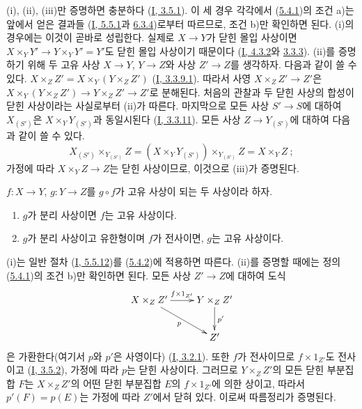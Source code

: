 (i), (ii), (iii)만 증명하면 충분하다
(\hyperref[I.3.5.1-ko]{I, 3.5.1}). 이 세 경우 각각에서
(\hyperref[II.5.4.1-ko]{5.4.1})의 조건 a)는 앞에서 얻은 결과들
(\hyperref[I.5.5.1-ko]{I, 5.5.1}과
\hyperref[I.6.3.4-ko]{6.3.4})로부터 따르므로, 조건 b)만 확인하면 된다.
(i)의 경우에는 이것이 곧바로 성립한다. 실제로 $X\to Y$가 닫힌 몰입
사상이면 $X\times_YY'\to Y\times_YY'=Y'$도 닫힌 몰입 사상이기 때문이다
(\hyperref[I.4.3.2-ko]{I, 4.3.2}와
\hyperref[II.3.3.3-ko]{3.3.3}). (ii)를 증명하기 위해 두 고유 사상
$X\to Y$, $Y\to Z$와 사상 $Z'\to Z$를 생각하자. 다음과 같이 쓸 수 있다.
$X\times_ZZ'=X\times_Y(Y\times_ZZ')$
(\hyperref[I.3.3.9.1-ko]{I, 3.3.9.1}). 따라서 사영
$X\times_ZZ'\to Z'$은
$X\times_Y(Y\times_ZZ')\to Y\times_ZZ'\to Z'$로 분해된다. 처음의
관찰과 두 닫힌 사상의 합성이 닫힌 사상이라는 사실로부터 (ii)가 따른다.
마지막으로 모든 사상 $S'\to S$에 대하여 $X_{(S')}$은
$X\times_YY_{(S')}$과 동일시된다
(\hyperref[I.3.3.11-ko]{I, 3.3.11}). 모든 사상
$Z\to Y_{(S')}$에 대하여 다음과 같이 쓸 수 있다.
\[
  X_{(S')}\times_{Y_{(S')}}Z
  =(X\times_YY_{(S')})\times_{Y_{(S')}}Z=X\times_YZ~;
\]
가정에 따라 $X\times_YZ\to Z$는 닫힌 사상이므로, 이것으로 (iii)가
증명된다.

\begin{corollary}[5.4.3]
\label{II.5.4.3-ko}
$f:X\to Y$, $g:Y\to Z$를 $g\circ f$가 고유 사상이 되는 두 사상이라
하자.
\begin{enumerate}
  \item[\rm{(i)}] $g$가 분리 사상이면 $f$는 고유 사상이다.
  \item[\rm{(ii)}] $g$가 분리 사상이고 유한형이며 $f$가 전사이면,
  $g$는 고유 사상이다.
\end{enumerate}
\end{corollary}

(i)는 일반 절차
(\hyperref[I.5.5.12-ko]{I, 5.5.12})를
(\hyperref[II.5.4.2-ko]{5.4.2})에 적용하면 따른다. (ii)를 증명할
때에는 정의 (\hyperref[II.5.4.1-ko]{5.4.1})의 조건 b)만 확인하면 된다.
모든 사상 $Z'\to Z$에 대하여 도식
\[
  \xymatrix{
    X\times_ZZ'\ar[r]^{f\times1_{Z'}}\ar[dr]_p &
    Y\times_ZZ'\ar[d]^{p'}\\
    & Z'
  }
\]
은 가환한다(여기서 $p$와 $p'$은 사영이다)
(\hyperref[I.3.2.1-ko]{I, 3.2.1}). 또한 $f$가 전사이므로
$f\times1_{Z'}$도 전사이고
(\hyperref[I.3.5.2-ko]{I, 3.5.2}), 가정에 따라 $p$는 닫힌 사상이다.
그러므로 $Y\times_ZZ'$의 모든 닫힌 부분집합 $F$는
$X\times_ZZ'$의 어떤 닫힌 부분집합 $E$의 $f\times1_{Z'}$에 의한 상이고,
따라서 $p'(F)=p(E)$는 가정에 따라 $Z'$에서 닫혀 있다. 이로써 따름정리가
증명된다.

